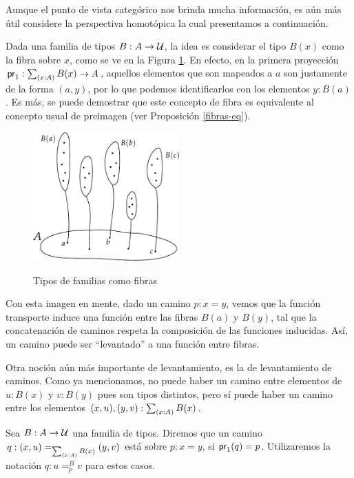 \documentclass[../main.tex]{subfiles}
\begin{document}
Aunque el punto de vista categ\'orico nos brinda mucha informaci\'on, es a\'un m\'as \'util considere la perspectiva homot\'opica la cual presentamos a continuaci\'on.

Dada una familia de tipos $B:A \to \mathcal{U}$, la idea es considerar el tipo $B(x)$ como la fibra sobre $x$, como se ve en la Figura \ref{fig-fibras}.
En efecto, en la primera proyecci\'on $\fst: \tsm{x:A}B(x) \to A$, aquellos elementos que son mapeados a $a$ son justamente de la forma $(a,y)$, por lo que podemos identificarlos con los elementos $y:B(a)$. Es m\'as, se puede demostrar que este concepto de fibra es equivalente al concepto usual de preimagen (ver Proposici\'on \ref{fibras-eq}).

\begin{figure}[h]
  \caption{Tipos de familias como fibras}
  \centering
  \vspace{1em}
  \includegraphics[width=0.5\textwidth]{images/fibras}
  \label{fig-fibras}
\end{figure}

Con esta imagen en mente, dado un camino $p:x=y$, vemos que la función transporte induce una función entre las fibras $B(a)$ y $B(y)$, tal que la concatenaci\'on de caminos respeta la composición de las funciones inducidas.
As\'i, un camino puede ser ``levantado'' a una funci\'on entre fibras.

Otra noci\'on a\'un m\'as importante de levantamiento, es la de levantamiento de caminos.
Como ya mencionamos, no puede haber un camino entre elementos de $u:B(x)$ y $v:B(y)$ pues son tipos distintos, pero s\'i puede haber un camino entre los elementos $(x,u),(y,v):\tsm{x:A}B(x)$.

\begin{definition}
  Sea $B:A\to \mathcal{U}$ una familia de tipos. Diremos que un camino $q:\id[\sm{x:A}B(x)]{(x,u)}{(y,v)}$ est\'a sobre $p:x=y$, si $\mathsf{pr}_{1}(q) = p$. Utilizaremos la notaci\'on $q: u =_p^B v$ para estos casos.
\end{definition}
\end{document}
